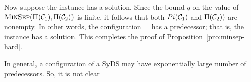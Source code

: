 Now suppose the \mps{} instance has a solution.
Since the bound $q$ on the value of 
$\mbox{\textsc{MinSep}}(\Pi(\mbox{$\mathcal{C}_{1}$}), \Pi(\mbox{$\mathcal{C}_{2}$}))$ is finite, 
it follows that both 
$Pi(\mbox{$\mathcal{C}_{1}$})$ and $\Pi(\mbox{$\mathcal{C}_{2}$}))$ are nonempty. 
In other words, the configuration \calctwo{} = \calc{}
has a predecessor; that is, the \pre{} instance has a solution.
This completes the proof of Proposition~\ref{pro:minsep-hard}. \QED

In general, a configuration of a SyDS may have exponentially large
number of predecessors.
So, it is not clear


